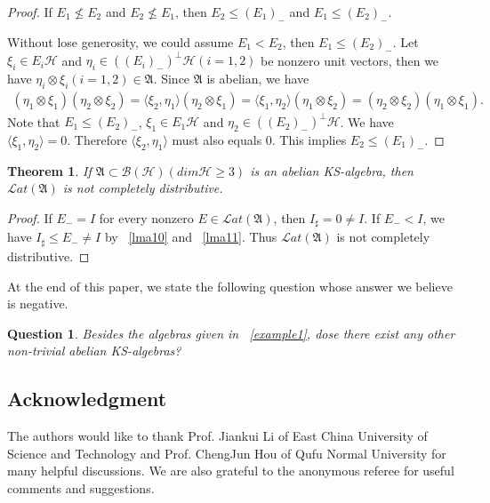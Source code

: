 \documentclass[a4paper,10pt]{amsart}
\newtheorem{theorem}{Theorem}[section]
\newtheorem{question}{Question}[section]
\theoremstyle{refs}
\newcommand{\AAA}{\mathfrak A}
\newcommand{\BBB}{\mathcal B}
\newcommand{\HHH}{\mathcal H} %
\newcommand{\Lat}{\mathcal Lat}
\begin{document}
\begin{proof} If $E_{1} \nleq E_{2}$ and $E_{2} \nleq
E_{1}$, then $E_{2}\leq (E_{1})_{-}$ and
$E_{1}\leq(E_{2})_{-}$.

Without lose generosity, we could assume  $E_{1}< E_{2}$, then
$E_{1}\leq(E_{2})_{-}$.
Let $\xi_{i}\in E_{i}\HHH$ and $\eta_{i}\in
((E_{i})_{-})^{\perp}\HHH(i=1,2)$ be nonzero unit vectors, then we have
$\eta_{i}\otimes\xi_{i}(i=1,2) \in \AAA$. Since $\AAA$ is abelian,
we have
\begin{align*}
(\eta_{1}\otimes\xi_{1})(\eta_{2}\otimes\xi_{2})=\langle\xi_{2},\eta_{1}
\rangle(\eta_{2}
\otimes\xi_{1})=\langle\xi_{1},\eta_{2}\rangle(\eta_{1}\otimes\xi_{2})=(\eta_{2}
\otimes
   \xi_{2})(\eta_{1}\otimes\xi_{1}).
   \end{align*}
Note that $E_{1} \leq (E_{2})_{-}$, $\xi_{1}\in E_{1}\HHH$ and
$\eta_{2}\in ((E_{2})_{-})^{\perp}\HHH$. We have $\langle \xi_1, \eta_2 \rangle
= 0$. Therefore $\langle\xi_{2},\eta_{1}\rangle$ must also equals $0$. This
implies $E_{2} \leq (E_{1})_{-}$.
\end{proof}

\begin{theorem} \label{thm4}
If $\AAA \subset \BBB(\HHH)(dim\HHH \geq 3)$ is an abelian
KS-algebra, then $\Lat(\AAA)$ is not completely distributive.
\end{theorem}

\begin{proof}
If $E_{-}=I$ for every nonzero $E\in\Lat(\AAA)$, then $I_{\sharp}=0\neq I$.
If $E_{-} < I$, we have $I_{\sharp} \leq E_{-} \neq I$ by ~\cref{lma10} and
~\cref{lma11}. Thus $\Lat(\AAA)$ is not completely distributive.
\end{proof}

At the end of this paper, we state the following question whose answer we
believe is
negative.

\begin{question}
Besides the algebras given in ~\cref{example1}, dose there exist any other
non-trivial abelian KS-algebras?
\end{question}

\subsection*{Acknowledgment}
The authors would like to thank Prof. Jiankui Li of East China
University of Science and Technology and Prof. ChengJun Hou
of Qufu Normal University for many helpful discussions. We are
also grateful to the anonymous referee for useful comments and
suggestions.
\end{document}

